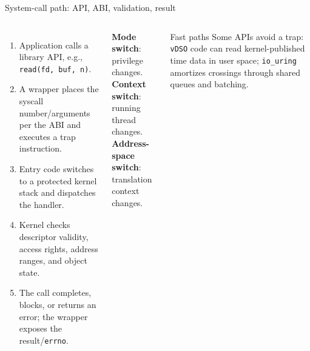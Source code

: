 \documentclass[aspectratio=169,11pt]{beamer}
\newcommand{\code}[1]{\texttt{#1}}
\begin{document}
\begin{frame}{System-call path: API, ABI, validation, result}
  \begin{columns}[T,onlytextwidth]
      \begin{enumerate}
        \item Application calls a library API, e.g., \code{read(fd, buf, n)}.
        \item A wrapper places the syscall number/arguments per the ABI and executes a trap instruction.
        \item Entry code switches to a protected kernel stack and dispatches the handler.
        \item Kernel checks descriptor validity, access rights, address ranges, and object state.
        \item The call completes, blocks, or returns an error; the wrapper exposes the result/\code{errno}.
      \end{enumerate}
      \begin{tcolorbox}[title=Three different events]
        \small
        \textbf{Mode switch}: privilege changes.\\
        \textbf{Context switch}: running thread changes.\\
        \textbf{Address-space switch}: translation context changes.
      \end{tcolorbox}
      \begin{exampleblock}{Fast paths}
        Some APIs avoid a trap: \code{vDSO} code can read kernel-published time data in user space; \code{io\_uring} amortizes crossings through shared queues and batching.
      \end{exampleblock}
  \end{columns}
\end{frame}
\end{document}

